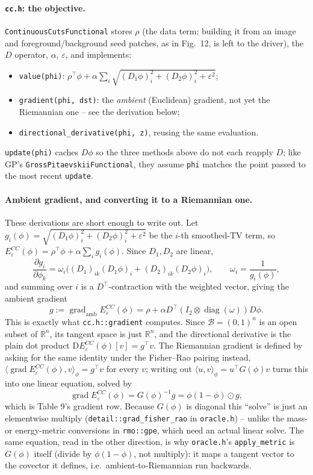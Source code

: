 \documentclass[11pt]{article}
\newcommand{\B}{\mathcal{B}}
\begin{document}
\paragraph{\texttt{cc.h}: the objective.} \texttt{ContinuousCutsFunctional} stores $\rho$
(the data term; building it from an image and foreground/background seed patches, as in
Fig.~12, is left to the driver), the $D$ operator, $\alpha$, $\varepsilon$, and implements:
\begin{itemize}[nosep]
  \item \texttt{value(phi)}: $\rho^\top\phi + \alpha\sum_i\sqrt{(D_1\phi)_i^2+(D_2\phi)_i^2+\varepsilon^2}$;
  \item \texttt{gradient(phi, dst)}: the \emph{ambient} (Euclidean) gradient, not yet the
        Riemannian one -- see the derivation below;
  \item \texttt{directional\_derivative(phi, z)}, reusing the same evaluation.
\end{itemize}
\texttt{update(phi)} caches $D\phi$ so the three methods above do not each reapply $D$; like
GP's \texttt{GrossPitaevskiiFunctional}, they assume \texttt{phi} matches the point passed
to the most recent \texttt{update}.

\paragraph{Ambient gradient, and converting it to a Riemannian one.} These derivations are
short enough to write out. Let $g_i(\phi)=\sqrt{(D_1\phi)_i^2+(D_2\phi)_i^2+\varepsilon^2}$
be the $i$-th smoothed-TV term, so $E_\varepsilon^{CC}(\phi)=\rho^\top\phi+\alpha\sum_i g_i(\phi)$.
Since $D_1,D_2$ are linear,
\[
  \frac{\partial g_i}{\partial\phi_k} = \omega_i\big((D_1)_{ik}(D_1\phi)_i+(D_2)_{ik}(D_2\phi)_i\big),
  \qquad \omega_i=\frac1{g_i(\phi)},
\]
and summing over $i$ is a $D^\top$-contraction with the weighted vector, giving the ambient
gradient
\[
  g := \operatorname{grad}_{\mathrm{amb}}E_\varepsilon^{CC}(\phi) = \rho + \alpha D^\top(I_2\otimes\operatorname{diag}(\omega))D\phi.
\]
This is exactly what \texttt{cc.h::gradient} computes. Since $\B=(0,1)^n$ is an open subset
of $\mathbb R^n$, its tangent space is just $\mathbb R^n$, and the directional derivative is
the plain dot product $\mathrm DE_\varepsilon^{CC}(\phi)[v]=g^\top v$. The Riemannian
gradient is defined by asking for the same identity under the Fisher--Rao pairing instead,
$\langle\operatorname{grad}E_\varepsilon^{CC}(\phi),v\rangle_\phi = g^\top v$ for every $v$;
writing out $\langle u,v\rangle_\phi=u^\top G(\phi)v$ turns this into one linear equation,
solved by
\[
  \operatorname{grad}E_\varepsilon^{CC}(\phi) = G(\phi)^{-1}g = \phi(1-\phi)\odot g,
\]
which is Table 9's gradient row. Because $G(\phi)$ is diagonal this ``solve'' is just an
elementwise multiply (\texttt{detail::grad\_fisher\_rao} in \texttt{oracle.h}) -- unlike the
mass- or energy-metric conversions in \texttt{rmo::gpe}, which need an actual linear solve.
The same equation, read in the other direction, is why \texttt{oracle.h}'s
\texttt{apply\_metric} is $G(\phi)$ itself (divide by $\phi(1-\phi)$, not multiply): it maps
a tangent vector to the covector it defines, i.e.\ ambient-to-Riemannian run backwards.
\end{document}
